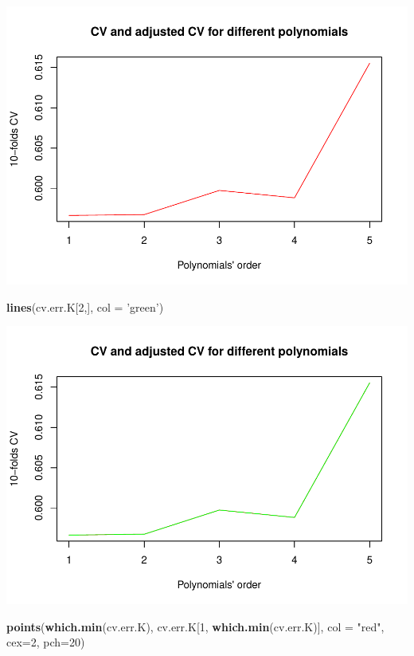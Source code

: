 \documentclass[]{article}
\newenvironment{Shaded}{\begin{snugshade}}{\end{snugshade}}
\newcommand{\KeywordTok}[1]{\textcolor[rgb]{0.13,0.29,0.53}{\textbf{#1}}}
\newcommand{\DataTypeTok}[1]{\textcolor[rgb]{0.13,0.29,0.53}{#1}}
\newcommand{\DecValTok}[1]{\textcolor[rgb]{0.00,0.00,0.81}{#1}}
\newcommand{\StringTok}[1]{\textcolor[rgb]{0.31,0.60,0.02}{#1}}
\newcommand{\NormalTok}[1]{#1}
\begin{document}
\includegraphics{TSLproject_files/figure-latex/unnamed-chunk-16-1.pdf}

\begin{Shaded}
\begin{Highlighting}[]
\KeywordTok{lines}\NormalTok{(cv.err.K[}\DecValTok{2}\NormalTok{,], }\DataTypeTok{col =} \StringTok{'green'}\NormalTok{)}
\end{Highlighting}
\end{Shaded}

\includegraphics{TSLproject_files/figure-latex/unnamed-chunk-16-2.pdf}

\begin{Shaded}
\begin{Highlighting}[]
\KeywordTok{points}\NormalTok{(}\KeywordTok{which.min}\NormalTok{(cv.err.K), cv.err.K[}\DecValTok{1}\NormalTok{, }\KeywordTok{which.min}\NormalTok{(cv.err.K)], }\DataTypeTok{col =} \StringTok{"red"}\NormalTok{, }\DataTypeTok{cex=}\DecValTok{2}\NormalTok{, }\DataTypeTok{pch=}\DecValTok{20}\NormalTok{)}
\end{Highlighting}
\end{Shaded}
\end{document}
